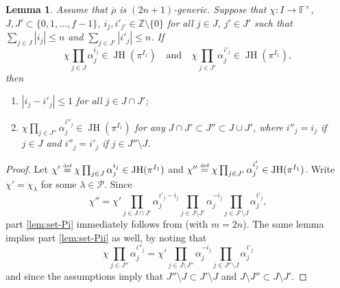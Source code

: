 \documentclass[JEP,XML,SOM,Unicode,NoFloatCountersInSection, NoEqCountersInSection,published]{cedram}
\newcommand{\quand}{\quad\text{and}\quad}
\newcommand{\defeq}{\stackrel{\textrm{\tiny{\upshape{def}}}}{=}}
\newcommand{\F}{\mathbb{F}}
\newcommand{\Z}{{\mathbb Z}}
\renewcommand{\P}{\mathscr P}
\newcommand{\brho}{\overline{\rho}}
\newcommand{\s}{^\times}
\DeclareMathOperator{\JH}{\mathrm{JH}}
\theoremstyle{plain}
\newtheorem{lem}[prop]{Lemma}
\theoremstyle{definition}
\begin{document}
\begin{lem}\label{lem:set-P}
Assume that $\brho$ is {$(2n+1)$}-generic.
Suppose that $\chi: I \to \F\s$, $J, J' \subset \{0,1,\dots,f-1\}$, $i_j, i'_{j'} \in \Z \setminus \{0\}$ for all $j \in J$, $j' \in J'$ such that $\sum_{j\in J} |i_j| \le n$ and $\sum_{j\in J'} |i'_j| \le n$.
If
\[
\chi \prod_{j \in J} \alpha_j^{i_j} \in \JH(\pi^{I_1})\quand\chi \prod_{j \in J'} \alpha_j^{i'_j} \in \JH(\pi^{I_1}),
\]
then
\begin{enumerate}
\item\label{lem:set-Pi} $|i_j - i'_j| \le 1$ for all $j \in J \cap J'$;
\item\label{lem:set-Pii} $\chi \prod_{j \in J''} \alpha_j^{i''_j} \in \JH(\pi^{I_1})$ for any $J \cap J' \subset J'' \subset J \cup J'$,
where $i''_j = i_j$ if $j \in J$ and $i''_j = i'_j$ if $j \in J'' \setminus J$.
\end{enumerate}
\end{lem}

\begin{proof}
Let $\chi' \defeq \chi \prod_{j \in J} \alpha_j^{i_j} \in \JH(\pi^{I_1})$ and $\chi'' \defeq \chi \prod_{j \in J'} \alpha_j^{i'_j} \in \JH(\pi^{I_1})$.
Write $\chi' = \chi_\lambda$ for some $\lambda \in \P$.
Since
\begin{equation*}
\chi'' = \chi' \prod_{j \in J \cap J'} \alpha_j^{i'_j-i_j} \prod_{j \in J \setminus J'} \alpha_j^{-i_j} \prod_{j \in J' \setminus J} \alpha_j^{i'_j},
\end{equation*}
part \eqref{lem:set-Pi} immediately follows from \cite[Lem.\,2.3.6(ii)]{BHHMS4} (with $m = 2n$).
The same lemma implies part \eqref{lem:set-Pii} as well, by noting that
\begin{equation*}
\chi \prod_{j \in J''} \alpha_j^{i''_j} = \chi' \prod_{j \in J \setminus J''} \alpha_j^{-i_j} \prod_{j \in J'' \setminus J} \alpha_j^{i'_j}
\end{equation*}
and since the assumptions imply that $J'' \setminus J \subset J' \setminus J$ and $J \setminus J'' \subset J \setminus J'$.
\end{proof}
\end{document}
